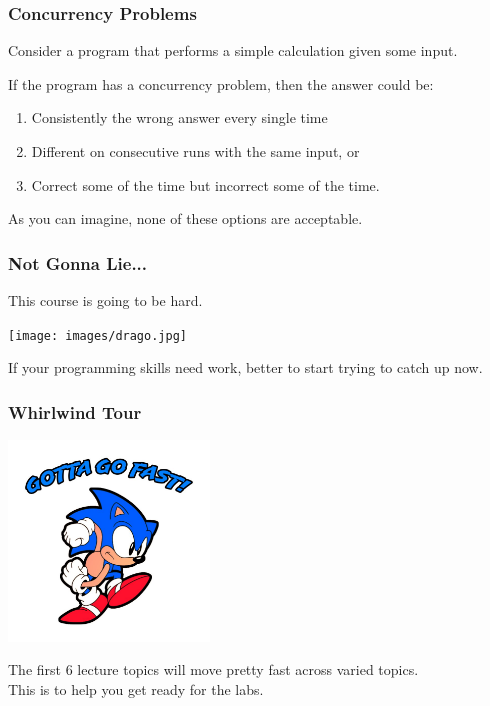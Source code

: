 \begin{frame}
	\frametitle{Concurrency Problems}

	Consider a program that performs a simple calculation given some input.

	If the program has a concurrency problem,  then the answer could be:

	\begin{enumerate}
		\item Consistently the wrong answer every single time
		\item Different on consecutive runs with the same input, or
		\item Correct some of the time but incorrect some of the time.
	\end{enumerate}

	As you can imagine, none of these options are acceptable.

\end{frame}


\begin{frame}
	\frametitle{Not Gonna Lie...}

	This course is going to be hard.

	\begin{center}
		\texttt{[image: images/drago.jpg]}
	\end{center}

	If your programming skills need work, better to start trying to catch up now.

\end{frame}

\begin{frame}
\frametitle{Whirlwind Tour}

\begin{center}
  \includegraphics[width=0.4\textwidth]{images/sonic.jpg}
\end{center}

The first 6 lecture topics will move pretty fast across varied topics.\\
\quad This is to help you get ready for the labs.

\end{frame}


